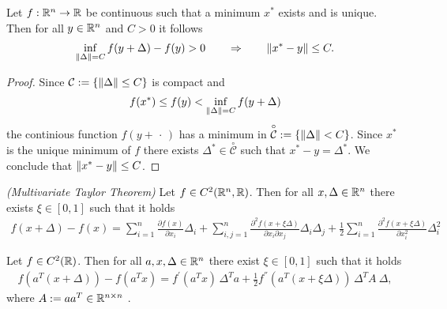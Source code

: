 \begin{proposition}
  Let 
  $f : \mathbb{R}^n \to \mathbb{R}$ 
  be continuous such that 
  a minimum $x^*$ exists and is unique.
  Then 
  for all $y \in \mathbb{R}^n$ and $C>0$ 
  it follows
    \begin{gather}
      \inf_{\left\lVert\Delta\right\rVert=C} f(y+\Delta) - f(y) > 0 \qquad
      \Rightarrow \qquad 
      \left\lVert x^* - y\right\rVert \le C.
    \end{gather}
\end{proposition}


\begin{proof}
Since 
$\mathcal{C}:=\left\{ \left\lVert\Delta\right\rVert\le C \right\}$
is compact and
\begin{gather*}
  f(x^*) \le f(y) <  \inf_{\left\lVert\Delta\right\rVert=C} f(y+\Delta)
\end{gather*}
the continious function $f(y+\,\cdot\,)$ has a minimum in 
$\overset{\circ}{\mathcal{C}}:=\left\{ \left\lVert\Delta\right\rVert < C \right\}$. 
Since 
$x^*$ is the unique minimum of $f$
there exists $\Delta^* \in \overset{\circ}{\mathcal{C}}$ 
such that 
$x^* - y = \Delta^*$.
We conclude that
$\left\lVert x^* - y\right\rVert \le C$.
\end{proof}



\begin{theorem}
  \emph{(Multivariate Taylor Theorem)}
  Let 
  $f \in C^2(\mathbb{R}^n, \mathbb{R})$.
  Then 
  for all $x, \Delta \in \mathbb{R}^n$
  there exists $\xi \in [0,1]$
  such that 
  it holds
  \begin{gather}
    \label{syu_taylor}
    f(x + \Delta) - f(x)
    =
    \sum_{i = 1}^{n} \frac{\partial f(x)}{\partial x_i} \Delta_i    
    + \sum_{i,j = 1}^{n}  \frac{\partial^2 f(x + \xi \Delta)}{\partial x_i \partial x_j} \Delta_i\Delta_j
    + \frac{1}{2}\sum_{i = 1}^{n} \frac{\partial^2 f(x + \xi \Delta)}{\partial x_i^2}\Delta_i^2 
  \end{gather}
\end{theorem}


\begin{corollary}
  Let 
  $f\in C^2(\mathbb{R})$. 
  Then
  for all $a,x,\Delta \in \mathbb{R}^n$ 
  there exist $\xi \in [0,1]$ 
  such that it holds
  \begin{gather}
    \label{syu_2.result}
    f(a^T (x + \Delta)) - f(a^T x) = 
    f^{'}(a^T x)\, \Delta^T a + 
    \frac{1}{2}f^{''}(a^T (x + \xi \Delta))\, \Delta^T A\ \Delta,
  \end{gather}
  where 
  $A:= a a^T \in \mathbb{R}^{n \times n}$ .
\end{corollary}

